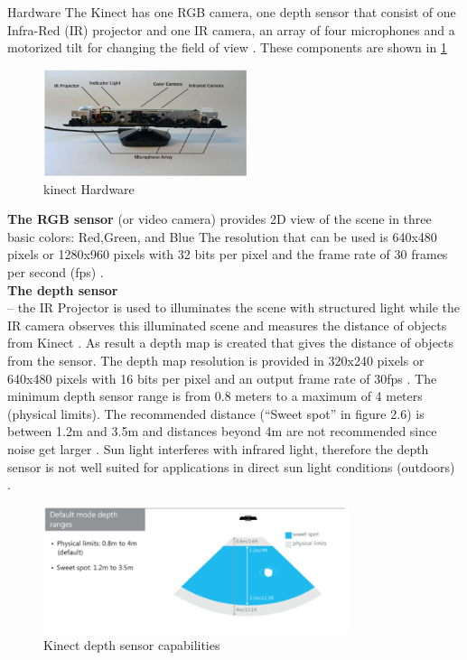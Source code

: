 Hardware The Kinect has one RGB camera, one depth sensor that consist of one Infra-Red (IR) projector and one IR camera, an array of four microphones and a motorized tilt for changing the field of view \cite{kinect15}. These components are shown in \ref{fig:cam2}

\begin{figure}[H]
\centering
\includegraphics[width=0.53\textwidth]{img/kinectcamera2.png}
\caption{ kinect Hardware }
\label{fig:cam2}
\end{figure}

\textbf{The RGB sensor}  (or video camera) provides 2D view of the scene in three basic colors: Red,Green, and Blue \cite{kinect15} The resolution that can be used is 640x480 pixels or 1280x960 pixels with 32 bits per pixel and the frame rate of 30 frames per second (fps) \cite{kinect15}. \\

\textbf{The depth sensor} \\
– the IR Projector is used to illuminates the scene with structured light while the IR camera observes this illuminated scene and measures the distance of objects from Kinect \cite{kinect15}. As result a depth map is created that gives the distance of objects from the sensor. The depth
map resolution is provided in 320x240 pixels or 640x480 pixels with 16 bits per pixel and an  output frame rate of 30fps \cite{kinect15}. The minimum depth sensor range is from 0.8 meters to a maximum of 4 meters (physical limits). The recommended distance (“Sweet spot” in figure 2.6) is between 1.2m and 3.5m and distances beyond 4m are not recommended since noise get larger \cite{kinect17}. Sun light interferes with infrared light, therefore the depth sensor is not well suited for applications in direct sun light conditions (outdoors)\cite{kinect17} .  

\begin{figure}[H]
\centering
\includegraphics[width=0.8\textwidth]{img/afterworking1.png}
\caption{Kinect depth sensor capabilities}
\label{fig:cam3}
\end{figure}

